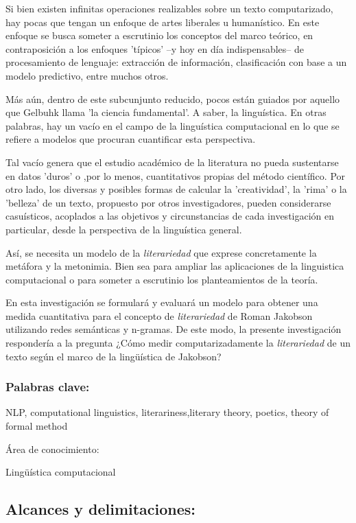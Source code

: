 \documentclass[twoside]{article}
\begin{document}
Si bien existen infinitas operaciones realizables sobre un texto
computarizado, hay pocas que tengan un enfoque de artes liberales u
humanístico. En este enfoque se busca someter a escrutinio los
conceptos del marco teórico, en contraposición a los enfoques
'típicos' --y hoy en día indispensables-- de procesamiento de
lenguaje: extracción de información, clasificación con base a un
modelo predictivo, entre muchos otros.

Más aún, dentro de este subcunjunto reducido, pocos están guiados por
aquello que Gelbuhk llama 'la ciencia fundamental'. A saber, la
linguística. En otras palabras, hay un vacío en el campo de la
linguística computacional en lo que se refiere a modelos que procuran
cuantificar esta perspectiva.

Tal vacío genera que el estudio académico de la literatura no pueda
sustentarse en datos 'duros' o ,por lo menos, cuantitativos propias
del método científico. Por otro lado, los diversas y posibles formas
de calcular la 'creatividad', la 'rima' o la 'belleza' de un texto,
propuesto por otros investigadores, pueden considerarse casuísticos,
acoplados a las objetivos y circunstancias de cada investigación en
particular, desde la perspectiva de la linguística general.

Así, se necesita un modelo de la \emph{literariedad} que exprese
concretamente la metáfora y la metonimia. Bien sea para ampliar las
aplicaciones de la linguistica computacional o para someter a
escrutinio los planteamientos de la teoría.

En esta investigación se formulará y evaluará un modelo para obtener
una medida cuantitativa para el concepto de \emph{literariedad} de Roman
Jakobson utilizando redes semánticas y n-gramas. De este modo, la
presente investigación respondería a la pregunta ¿Cómo medir
computarizadamente la \emph{literariedad} de un texto según el marco de la
lingüística de Jakobson?

\subsubsection{\textbf{Palabras clave:}}
\label{sec:orgd34e673}
NLP, computational linguistics, literariness,literary theory, poetics, theory of formal method

Área de conocimiento:

Lingüística computacional

\subsection{Alcances y delimitaciones:}
\label{sec:orgd0eb2a7}
\end{document}
